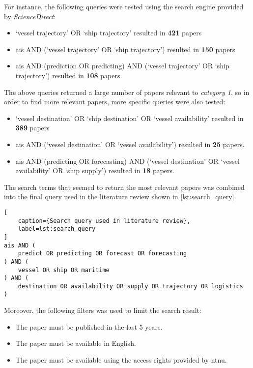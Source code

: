 For instance, the following queries were tested using the search engine provided by \textit{ScienceDirect}:

\begin{itemize}
    \item `vessel trajectory' OR `ship trajectory' resulted in \textbf{421} papers
    \item ais AND (`vessel trajectory' OR `ship trajectory') resulted in \textbf{150} papers
    \item ais AND (prediction OR predicting) AND (`vessel trajectory' OR `ship trajectory') resulted in \textbf{108} papers
\end{itemize}

The above queries returned a large number of papers relevant to \textit{category 1}, so in order to find more relevant papers, more specific queries were also tested:

\begin{itemize}
    \item `vessel destination' OR `ship destination' OR `vessel availability' resulted in \textbf{389} papers
    \item ais AND (`vessel destination' OR `vessel availability') resulted in \textbf{25} papers.
    \item ais AND (predicting OR forecasting) AND (`vessel destination' OR `vessel availability' OR `ship supply') resulted in \textbf{18} papers.
\end{itemize}

The search terms that seemed to return the most relevant papers was combined into the final query used in the literature review shown in \cref{lst:search_query}.

\begin{lstlisting}[
    caption={Search query used in literature review},
    label=lst:search_query
]
ais AND (
    predict OR predicting OR forecast OR forecasting
) AND (
    vessel OR ship OR maritime
) AND (
    destination OR availability OR supply OR trajectory OR logistics
)
\end{lstlisting}

Moreover, the following filters was used to limit the search result:

\begin{itemize}
    \item The paper must be published in the last 5 years.
    \item The paper must be available in English.
    \item The paper must be available using the access rights provided by \acrshort{ntnu}.
\end{itemize}

